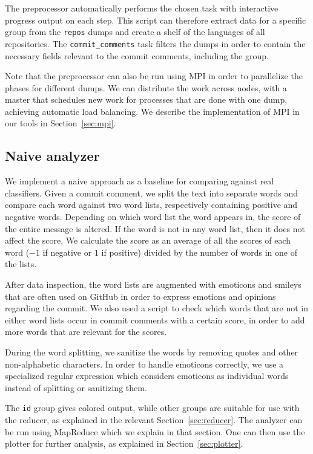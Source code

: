 \documentclass{article}
\begin{document}
The preprocessor automatically performs the chosen task with interactive 
progress output on each step. This script can therefore extract data for 
a specific group from the {\tt repos} dumps and create a shelf of the languages 
of all repositories. The {\tt commit\_comments} task filters the dumps in order 
to contain the necessary fields relevant to the commit comments, including the 
group.

Note that the preprocessor can also be run using MPI in order to parallelize 
the phases for different dumps. We can distribute the work across nodes, with 
a master that schedules new work for processes that are done with one dump, 
achieving automatic load balancing. We describe the implementation of MPI in 
our tools in Section~\ref{sec:mpi}.

\subsection{Naive analyzer}\label{sec:analyzer}

We implement a naive approach as a baseline for comparing against real 
classifiers. Given a commit comment, we split the text into separate words and 
compare each word against two word lists, respectively containing positive and 
negative words. Depending on which word list the word appears in, the score of 
the entire message is altered. If the word is not in any word list, then it 
does not affect the score. We calculate the score as an average of all the 
scores of each word ($-1$ if negative or $1$ if positive) divided by the number 
of words in one of the lists.

After data inspection, the word lists are augmented with emoticons and smileys 
that are often used on GitHub in order to express emotions and opinions 
regarding the commit. We also used a script to check which words that are not 
in either word lists occur in commit comments with a certain score, in order to 
add more words that are relevant for the scores.

During the word splitting, we sanitize the words by removing quotes and other 
non-alphabetic characters. In order to handle emoticons correctly, we use 
a specialized regular expression which considers emoticons as individual words 
instead of splitting or sanitizing them.

The {\tt id} group gives colored output, while other groups are suitable for 
use with the reducer, as explained in the relevant Section~\ref{sec:reducer}. 
The analyzer can be run using MapReduce which we explain in that section. One 
can then use the plotter for further analysis, as explained in 
Section~\ref{sec:plotter}.
\end{document}
